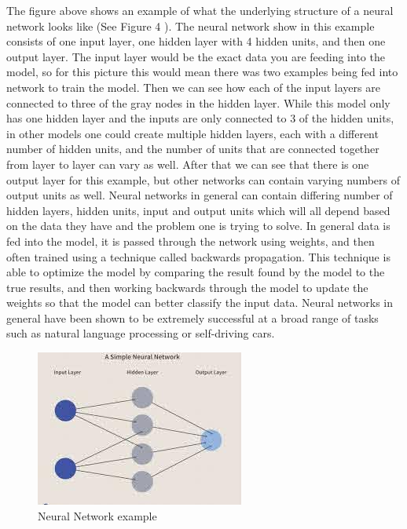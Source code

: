 \documentclass[12pt]{article}
\begin{document}
The figure above shows an example of what the underlying structure of a
neural network looks like (See Figure 4 \citet{Investopedia}). The
neural network show in this example consists of one input layer, one
hidden layer with 4 hidden units, and then one output layer. The input
layer would be the exact data you are feeding into the model, so for
this picture this would mean there was two examples being fed into
network to train the model. Then we can see how each of the input layers
are connected to three of the gray nodes in the hidden layer. While this
model only has one hidden layer and the inputs are only connected to 3
of the hidden units, in other models one could create multiple hidden
layers, each with a different number of hidden units, and the number of
units that are connected together from layer to layer can vary as well.
After that we can see that there is one output layer for this example,
but other networks can contain varying numbers of output units as well.
Neural networks in general can contain differing number of hidden
layers, hidden units, input and output units which will all depend based
on the data they have and the problem one is trying to solve. In general
data is fed into the model, it is passed through the network using
weights, and then often trained using a technique called backwards
propagation. This technique is able to optimize the model by comparing
the result found by the model to the true results, and then working
backwards through the model to update the weights so that the model can
better classify the input data. Neural networks in general have been
shown to be extremely successful at a broad range of tasks such as
natural language processing or self-driving cars.

\begin{figure}

{\centering \includegraphics[width=0.75\linewidth,height=0.25\textheight]{images/neural_net} 

}

\caption{Neural Network example}\label{fig:sample-fig5}
\end{figure}
\end{document}
